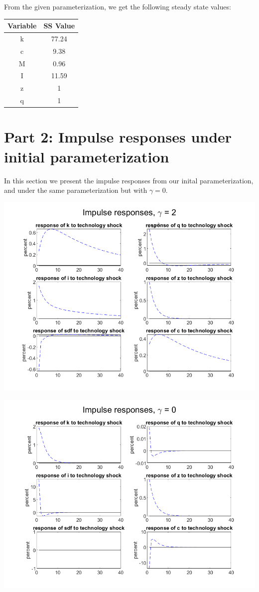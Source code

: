\documentclass[11pt]{article} %
\begin{document}
From the given parameterization, we get the following steady state values:
\begin{center}
\begin{tabular}{|c c|}
\hline
Variable & SS Value \\
\hline
k & 77.24\\
c & 9.38 \\
M & 0.96 \\
I & 11.59 \\
z & 1 \\
q & 1 \\
\hline
\end{tabular}
\end{center}

\section{Part 2: Impulse responses under initial parameterization}
In this section we present the impulse responses from our inital parameterization, and under the same parameterization but with $\gamma = 0$.

\begin{center}
\includegraphics{fig1}

\includegraphics{fig2}
\end{center}
\end{document}
